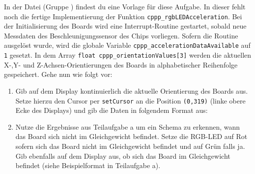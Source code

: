 In der Datei  (Gruppe ) findest du eine Vorlage für diese Aufgabe.
In dieser fehlt noch die fertige Implementierung der Funktion \lstinline|cppp_rgbLEDAcceleration|.
Bei der Initialisierung des Boards wird eine Interrupt-Routine gestartet, sobald neue Messdaten des Beschleunigungssensor des Chips vorliegen.
Sofern die Routine ausgelöst wurde, wird die globale Variable \lstinline|cppp_accelerationDataAvailable| auf \lstinline|1| gesetzt.  
In dem Array \lstinline|float cppp_orientationValues[3]| werden die aktuellen X-,Y- und Z-Achsen-Orientierungen des Boards in alphabetischer Reihenfolge gespeichert. 
Gehe nun wie folgt vor:
%
\begin{enumerate}
	\item
    Gib auf dem Display kontinuierlich die aktuelle Orientierung des Boards aus.
    Setze hierzu den Cursor per \lstinline|setCursor| an die Position \lstinline|(0,319)| (linke obere Ecke des Displays) und gib die Daten in folgendem Format aus:
%	
%	
%
	\item
    Nutze die Ergebnisse aus Teilaufgabe a um ein Schema zu erkennen, wann das Board sich nicht im Gleichgewicht befindet.
    Setze die RGB-LED auf Rot sofern sich das Board nicht im Gleichgewicht befindet und auf Grün falls ja.
    Gib ebenfalls auf dem Display aus, ob sich das Board im Gleichgewicht befindet (siehe Beispielformat in Teilaufgabe a). 
\end{enumerate}


